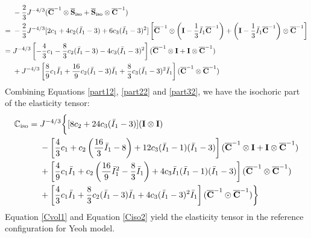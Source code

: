 \begin{equation} \label{part32}
\begin{split}
&-\frac{2}{3}J^{-4/3}({\overline{\bold{C}}}^{-1} \otimes {\overline{\bold{S}}}_\mathrm{iso} + {\overline{\bold{S}}}_\mathrm{iso} \otimes {\overline{{\bold{C}}}^{-1}})\\
= {} &
-\frac{2}{3}J^{-4/3}[2c_1 + 4c_2({\bar{I}}_1 - 3) + 6c_3({\bar{I}}_1 - 3)^2]
\left[{\overline{\bold{C}}}^{-1} \otimes \left(\bold{I} - \frac{1}{3}{\bar{I}_1}{\overline{\bold{C}}}^{-1}\right) + 
\left(\bold{I} - \frac{1}{3}{\bar{I}_1}{\overline{\bold{C}}}^{-1}\right) \otimes {\overline{\bold{C}}}^{-1}\right]\\
= {} &
J^{-4/3}  \left[-\frac{4}{3}c_1 - \frac{8}{3}c_2({\bar{I}}_1 - 3) - 4c_3({\bar{I}}_1 - 3)^2\right] ({\overline{\bold{C}}}^{-1} \otimes \bold{I} + \bold{I} \otimes {\overline{\bold{C}}}^{-1}) \\
&+ J^{-4/3}  \left[\frac{8}{9}c_1{\bar{I}}_1 + \frac{16}{9}c_2({\bar{I}}_1 - 3){\bar{I}}_1 + \frac{8}{3}c_3({\bar{I}}_1 - 3)^2{\bar{I}}_1 \right] ({\overline{\bold{C}}}^{-1} \otimes {\overline{\bold{C}}}^{-1})
\end{split}
\end{equation}
Combining Equations \ref{part12}, \ref{part22} and \ref{part32}, we have the isochoric part of the elasticity tensor:
\begin{equation} \label{Ciso2}
\begin{split}
{\mathbb{C}}_\mathrm{iso} = {} & J^{-4/3} \bigg\{
[8c_2+24c_3({\bar{I}}_1 - 3)] (\bold{I} \otimes \bold{I}) \\
&- \left[\frac{4}{3}c_1 + c_2\left(\frac{16}{3}{\bar{I}}_1 - 8\right) + 12c_3({\bar{I}}_1 - 1)({\bar{I}}_1 - 3)\right]({\overline{\bold{C}}}^{-1} \otimes \bold{I} + \bold{I} \otimes {\overline{\bold{C}}}^{-1})\\
&+ \left[\frac{4}{9}c_1{\bar{I}}_1 + c_2\left(\frac{16}{9}{{\bar{I}}_1}^2 - \frac{8}{3}{\bar{I}}_1\right) + 4c_3{\bar{I}}_1({\bar{I}}_1 - 1)({\bar{I}}_1 - 3)\right] ({\overline{\bold{C}}}^{-1} \otimes {\overline{\bold{C}}}^{-1}) \\
&+ \left[\frac{4}{3}c_1{\bar{I}}_1 + \frac{8}{3}c_2({\bar{I}}_1 - 3){\bar{I}}_1 + 4c_3({\bar{I}}_1 - 3)^2{\bar{I}}_1\right]({\overline{\bold{C}}}^{-1} \odot {\overline{\bold{C}}}^{-1})
\bigg\}
\end{split}
\end{equation}
Equation \ref{Cvol1} and Equation \ref{Ciso2} yield the elasticity tensor in the reference configuration for Yeoh model.

